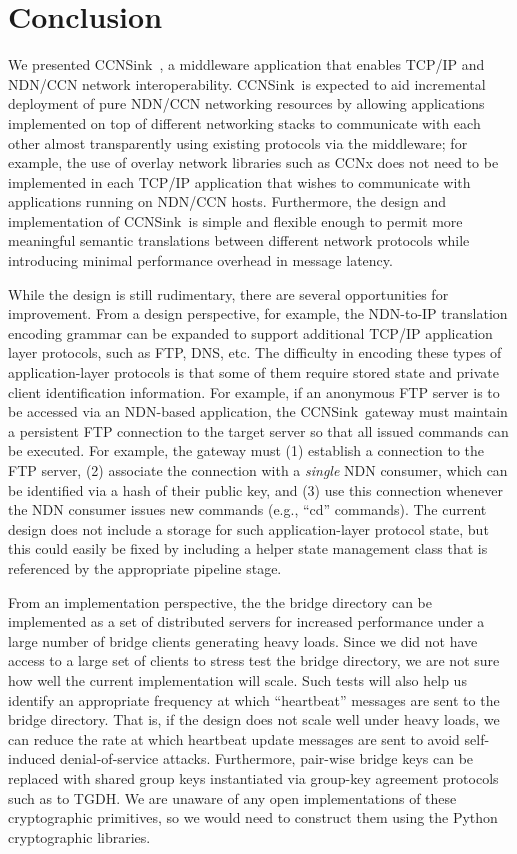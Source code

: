 \documentclass[11pt]{article}
\newcommand{\sink}{{\sf CCNSink}}
\begin{document}
\section{Conclusion}
We presented \sink\ , a middleware application that enables TCP/IP and NDN/CCN network interoperability. \sink\ is expected to aid incremental deployment of pure NDN/CCN networking resources by allowing applications implemented on top of different networking stacks to communicate with each other almost transparently using existing protocols via the middleware; for example, the use of overlay network libraries such as CCNx does not need to be implemented in each TCP/IP application that wishes to communicate with applications running on NDN/CCN hosts. Furthermore, the design and implementation of \sink\ is simple and flexible enough to permit more meaningful semantic translations between different network protocols while introducing minimal performance overhead in message latency. 

While the design is still rudimentary, there are several opportunities for improvement. From a design perspective, for example, the NDN-to-IP translation encoding grammar can be expanded to support additional TCP/IP application layer protocols, such as FTP, DNS, etc. The difficulty in encoding these types of application-layer protocols is that some of them require stored state and private client identification information. For example, if an anonymous FTP server is to be accessed via an NDN-based application, the \sink\ gateway must maintain a persistent FTP connection to the target server so that all issued commands can be executed. For example, the gateway must (1) establish a connection to the FTP server, (2) associate the connection with a \emph{single} NDN consumer, which can be identified via a hash of their public key, and (3) use this connection whenever the NDN consumer issues new commands (e.g., ``cd'' commands). The current design does not include a storage for such application-layer protocol state, but this could easily be fixed by including a helper state management class that is referenced by the appropriate pipeline stage. 

From an implementation perspective, the the bridge directory can be implemented as a set of distributed servers for increased performance under a large number of bridge clients generating heavy loads. Since we did not have access to a large set of clients to stress test the bridge directory, we are not sure how well the current implementation will scale. Such tests will also help us identify an appropriate frequency at which ``heartbeat'' messages are sent to the bridge directory. That is, if the design does not scale well under heavy loads, we can reduce the rate at which heartbeat update messages are sent to avoid self-induced denial-of-service attacks. Furthermore, pair-wise bridge keys can be replaced with shared group keys instantiated via group-key agreement protocols such as to TGDH. We are unaware of any open implementations of these cryptographic primitives, so we would need to construct them using the Python cryptographic libraries. 



\end{document}
